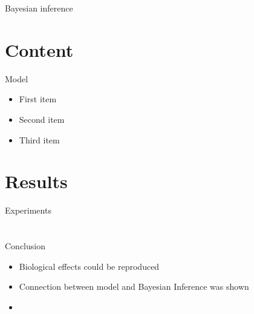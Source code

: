 \documentclass[aspectratio=169]{beamer}
\begin{document}
\begin{frame}{Bayesian inference}

\end{frame}


\section{Content}

\begin{frame}{Model}
  \begin{itemize}
    \item First item
    \item Second item
    \item Third item
  \end{itemize}
\end{frame}

\section{Results}
\begin{frame}{Experiments}

\end{frame}


\section*{}

\begin{frame}{Conclusion}
    \begin{itemize}
    \item Biological effects could be reproduced
    \item Connection between model and Bayesian Inference was shown
    \item 
  \end{itemize}

\end{frame}
\end{document}
